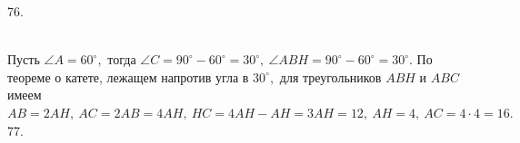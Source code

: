 \documentclass[12pt]{article}
\begin{document}
76. \begin{figure}[ht!]
\end{figure}\\
Пусть $\angle A=60^\circ,$ тогда $\angle C=90^\circ-60^\circ=30^\circ,\ \angle ABH=90^\circ-60^\circ=30^\circ.$ По теореме о катете, лежащем напротив угла в $30^\circ,$ для треугольников $ABH$ и $ABC$ имеем $AB=2AH,\ AC=2AB=4AH,\ HC=4AH-AH=3AH=12,\ AH=4,\ AC=4\cdot4=16.$\\
77. \begin{figure}[ht!]
\end{figure}\\
\end{document}
